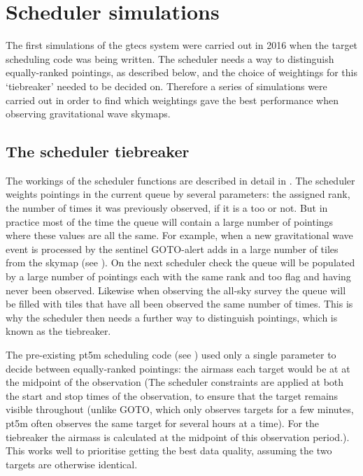 \section{Scheduler simulations}
\label{sec:scheduler_sims}
\begin{colsection}


\begin{colsection}

The first simulations of the \gls{gtecs} system were carried out in 2016 when the target scheduling code was being written. The scheduler needs a way to distinguish equally-ranked pointings, as described below, and the choice of weightings for this `tiebreaker' needed to be decided on. Therefore a series of simulations were carried out in order to find which weightings gave the best performance when observing gravitational wave skymaps.

\end{colsection}


\subsection{The scheduler tiebreaker}
\label{sec:scheduler_tiebreaker}
\begin{colsection}

The workings of the scheduler functions are described in detail in . The scheduler weights pointings in the current queue by several parameters: the assigned rank, the number of times it was previously observed, if it is a \gls{too} or not. But in practice most of the time the queue will contain a large number of pointings where these values are all the same. For example, when a new gravitational wave event is processed by the sentinel GOTO-alert adds in a large number of tiles from the skymap (see ). On the next scheduler check the queue will be populated by a large number of pointings each with the same rank and \gls{too} flag and having never been observed. Likewise when observing the all-sky survey the queue will be filled with tiles that have all been observed the same number of times. This is why the scheduler then needs a further way to distinguish pointings, which is known as the tiebreaker.

The pre-existing \gls{pt5m} scheduling code (see ) used only a single parameter to decide between equally-ranked pointings: the airmass each target would be at at the midpoint of the observation (The scheduler constraints are applied at both the start and stop times of the observation, to ensure that the target remains visible throughout (unlike GOTO, which only observes targets for a few minutes, \gls{pt5m} often observes the same target for several hours at a time). For the tiebreaker the airmass is calculated at the midpoint of this observation period.). This works well to prioritise getting the best data quality, assuming the two targets are otherwise identical.


\end{colsection}
\end{colsection}
